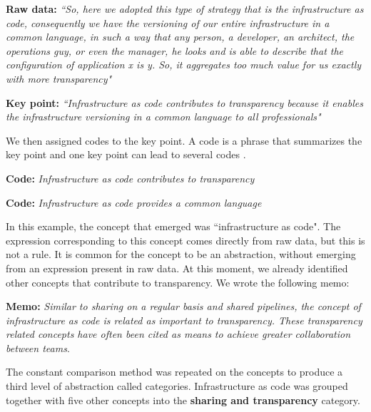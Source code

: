 \textbf{Raw data:} \textit{``So, here we adopted this type of strategy that is
the infrastructure as code, consequently we have the versioning of our entire
infrastructure in a common language, in such a way that any person, a
developer, an architect, the operations guy, or even the manager, he looks and
is able to describe that the configuration of application x is y. So, it
aggregates too much value for us exactly with more transparency"}

\textbf{Key point:} \textit{``Infrastructure as code contributes to
transparency because it enables the infrastructure versioning in a common
language to all professionals"}

We then assigned codes to the key point. A code is a phrase that summarizes
the key point and one key point can lead to several codes \cite{hoda2017becoming}.

\textbf{Code:} \textit{Infrastructure as code contributes to transparency}

\textbf{Code:} \textit{Infrastructure as code provides a common language}

In this example, the concept that emerged was ``infrastructure as code". The
expression corresponding to this concept comes directly from raw data, but this
is not a rule. It is common for the concept to be an abstraction, without
emerging from an expression present in raw data.
At this moment, we already identified other concepts that
contribute to transparency. We wrote the following memo:

\textbf{Memo:} \textit{Similar to sharing on a regular basis and shared
pipelines, the concept of infrastructure as code is related as important to
transparency. These transparency related concepts have often been cited as
means to achieve greater collaboration between teams}.

The constant comparison method was repeated on the concepts to produce a third
level of abstraction called categories. Infrastructure as code was grouped
together with five other concepts into the \textbf{sharing and transparency} category.
